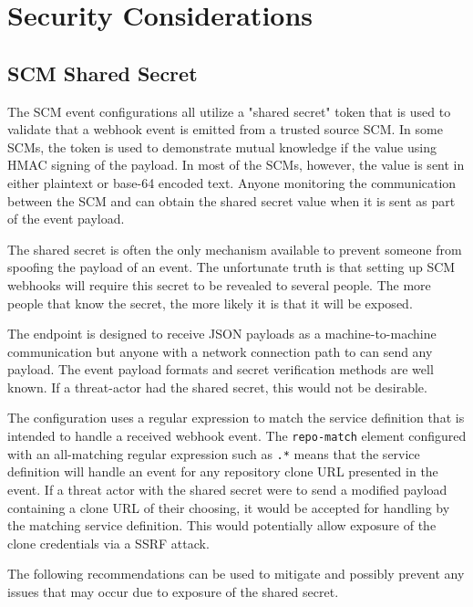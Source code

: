 \chapter{\cxoneflowtext\space Security Considerations}\label{sec:cxoneflow-security}


\section{SCM Shared Secret}

The SCM event configurations all utilize a "shared secret" token that is used to validate that
a webhook event is emitted from a trusted source SCM.  In some SCMs, the token is used to
demonstrate mutual knowledge if the value using HMAC signing of the payload.  In most
of the SCMs, however, the value is sent in either plaintext or base-64 encoded text.  Anyone
monitoring the communication between the SCM and \cxoneflow can obtain the shared secret
value when it is sent as part of the event payload.

The shared secret is often the only mechanism available to prevent someone from
spoofing the payload of an event.  The unfortunate truth is that setting up
SCM webhooks will require this secret to be revealed to several people. The more people
that know the secret, the more likely it is that it will be exposed.

The \cxoneflow endpoint is designed to receive JSON payloads as a machine-to-machine 
communication but anyone with a network connection path to \cxoneflow can send any
payload.  The event payload formats and secret verification methods are well
known.  If a threat-actor had the shared secret, this would not be desirable.

The \cxoneflow configuration uses a regular expression to match the service definition
that is intended to handle a received webhook event.  The \texttt{repo-match} element
configured with an all-matching regular expression such as \texttt{.*} means that the
service definition will handle an event for any repository clone URL presented in the
event.  If a threat actor with the shared secret were to send a modified payload
containing a clone URL of their choosing, it would be accepted for handling by
the matching service definition.  This would potentially allow exposure of the
clone credentials via a SSRF attack.

The following recommendations can be used to mitigate and possibly prevent any
issues that may occur due to exposure of the shared secret.

